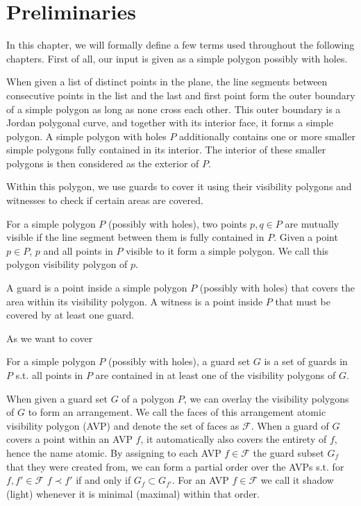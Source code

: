 \chapter{Preliminaries}
In this chapter, we will formally define a few terms used throughout the following chapters.
First of all, our input is given as a simple polygon possibly with holes.

\begin{definition}
When given a list of distinct points in the plane, the line segments between consecutive points in the list and the last and first point form the outer boundary of a simple polygon as long as none cross each other. This outer boundary is a Jordan polygonal curve, and together with its interior face, it forms a simple polygon. A simple polygon with holes $P$ additionally contains one or more smaller simple polygons fully contained in its interior. The interior of these smaller polygons is then considered as the exterior of $P$.
\end{definition}

Within this polygon, we use guards to cover it using their visibility polygons and witnesses to check if certain areas are covered.

\begin{definition}
For a simple polygon $P$ (possibly with holes), two points $p,q\in P$ are mutually visible if the line segment between them is fully contained in $P$. Given a point $p\in P$, $p$ and all points in $P$ visible to it form a simple polygon. We call this polygon visibility polygon of $p$.
\end{definition}

\begin{definition}
A guard is a point inside a simple polygon $P$ (possibly with holes) that covers the area within its visibility polygon. A witness is a point inside $P$ that must be covered by at least one guard.
\end{definition}

As we want to cover 

\begin{definition}
For a simple polygon $P$ (possibly with holes), a guard set $G$ is a set of guards in $P$ s.t. all points in $P$ are contained in at least one of the visibility polygons of $G$.
\end{definition}

\begin{definition}
When given a guard set $G$ of a polygon $P$, we can overlay the visibility polygons of $G$ to form an arrangement. We call the faces of this arrangement atomic visibility polygon (AVP) and denote the set of faces as $\mathcal{F}$. When a guard of $G$ covers a point within an AVP $f$, it automatically also covers the entirety of $f$, hence the name atomic. By assigning to each AVP $f\in\mathcal{F}$ the guard subset $G_{f}$ that they were created from, we can form a partial order over the AVPs s.t. for $f,f'\in\mathcal{F}$ $f\prec f'$ if and only if $G_{f}\subset G_{f'}$. For an AVP $f\in\mathcal{F}$ we call it shadow (light) whenever it is minimal (maximal) within that order.
\end{definition}

